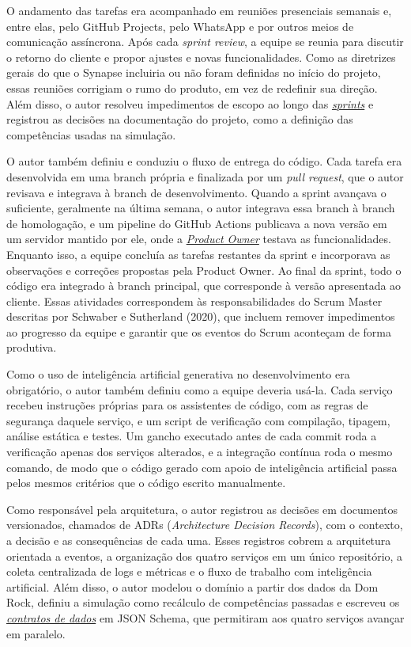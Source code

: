 \documentclass[12pt,a4paper]{article}
\newcommand{\termo}[2]{\hyperlink{gls:#1}{\textit{#2}}}
\begin{document}
O andamento das tarefas era acompanhado em reuniões presenciais semanais e, entre elas, pelo GitHub Projects, pelo WhatsApp e por outros meios de comunicação assíncrona. Após cada \textit{sprint review}, a equipe se reunia para discutir o retorno do cliente e propor ajustes e novas funcionalidades. Como as diretrizes gerais do que o Synapse incluiria ou não foram definidas no início do projeto, essas reuniões corrigiam o rumo do produto, em vez de redefinir sua direção. Além disso, o autor resolveu impedimentos de escopo ao longo das \termo{sprint}{sprints} e registrou as decisões na documentação do projeto, como a definição das competências usadas na simulação.

O autor também definiu e conduziu o fluxo de entrega do código. Cada tarefa era desenvolvida em uma branch própria e finalizada por um \textit{pull request}, que o autor revisava e integrava à branch de desenvolvimento. Quando a sprint avançava o suficiente, geralmente na última semana, o autor integrava essa branch à branch de homologação, e um pipeline do GitHub Actions publicava a nova versão em um servidor mantido por ele, onde a \termo{po}{Product Owner} testava as funcionalidades. Enquanto isso, a equipe concluía as tarefas restantes da sprint e incorporava as observações e correções propostas pela Product Owner. Ao final da sprint, todo o código era integrado à branch principal, que corresponde à versão apresentada ao cliente. Essas atividades correspondem às responsabilidades do Scrum Master descritas por Schwaber e Sutherland (2020), que incluem remover impedimentos ao progresso da equipe e garantir que os eventos do Scrum aconteçam de forma produtiva.

Como o uso de inteligência artificial generativa no desenvolvimento era obrigatório, o autor também definiu como a equipe deveria usá-la. Cada serviço recebeu instruções próprias para os assistentes de código, com as regras de segurança daquele serviço, e um script de verificação com compilação, tipagem, análise estática e testes. Um gancho executado antes de cada commit roda a verificação apenas dos serviços alterados, e a integração contínua roda o mesmo comando, de modo que o código gerado com apoio de inteligência artificial passa pelos mesmos critérios que o código escrito manualmente.

Como responsável pela arquitetura, o autor registrou as decisões em documentos versionados, chamados de ADRs (\textit{Architecture Decision Records}), com o contexto, a decisão e as consequências de cada uma. Esses registros cobrem a arquitetura orientada a eventos, a organização dos quatro serviços em um único repositório, a coleta centralizada de logs e métricas e o fluxo de trabalho com inteligência artificial. Além disso, o autor modelou o domínio a partir dos dados da Dom Rock, definiu a simulação como recálculo de competências passadas e escreveu os \termo{contrato}{contratos de dados} em JSON Schema, que permitiram aos quatro serviços avançar em paralelo.
\end{document}
